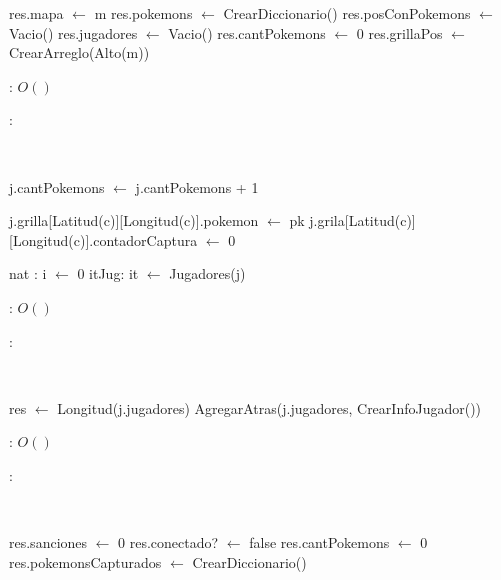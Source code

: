 \begin{Algoritmos}


	\begin{algorithm}[H]
		\NoCaptionOfAlgo
		\caption{}
		res.mapa $\leftarrow$ m\;
		res.pokemons $\leftarrow$ CrearDiccionario()\;
		res.posConPokemons $\leftarrow$ Vacio()\;
		res.jugadores $\leftarrow$ Vacio()\;
		res.cantPokemons $\leftarrow$ 0\;
		res.grillaPos $\leftarrow$ CrearArreglo(Alto(m))\;
	\end{algorithm}

	\complejidad: $O()$

	\justifcomp:

	~

	\begin{algorithm}[H]
		\NoCaptionOfAlgo
		\caption{}
		j.cantPokemons $\leftarrow$ j.cantPokemons + 1\;

		j.grilla[Latitud(c)][Longitud(c)].pokemon $\leftarrow$ pk\;
		j.grila[Latitud(c)][Longitud(c)].contadorCaptura $\leftarrow$ 0\;

		nat : i $\leftarrow$ 0\;
		itJug: it $\leftarrow$ Jugadores(j)\;
	\end{algorithm}

	\complejidad: $O()$

	\justifcomp:

	~

	\begin{algorithm}[H]
		\NoCaptionOfAlgo
		\caption{}
		res $\leftarrow$ Longitud(j.jugadores)\; 
		AgregarAtras(j.jugadores, CrearInfoJugador())\;
	\end{algorithm}

	\complejidad: $O()$

	\justifcomp:

	~

	\begin{algorithm}[H]
		\NoCaptionOfAlgo
		\caption{}
		res.sanciones $\leftarrow$ 0\;
		res.conectado? $\leftarrow$ false\;
		res.cantPokemons $\leftarrow$ 0\;
		res.pokemonsCapturados $\leftarrow$ CrearDiccionario()\;
	\end{algorithm}


\end{Algoritmos}
